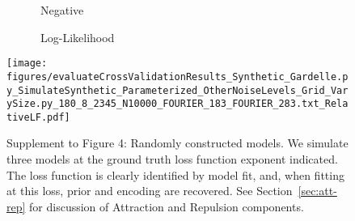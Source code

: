 \begin{figure}
\begin{minipage}[c]{0.8\linewidth}
\end{minipage}
\begin{minipage}[c]{0.19\linewidth}
\centering

\ \ \ \ \ \ Negative

\ \ \ \ \ \ Log-Likelihood


\texttt{[image: figures/evaluateCrossValidationResults\_Synthetic\_Gardelle.py\_SimulateSynthetic\_Parameterized\_OtherNoiseLevels\_Grid\_VarySize.py\_180\_8\_2345\_N10000\_FOURIER\_183\_FOURIER\_283.txt\_RelativeLF.pdf]}
\end{minipage}

\caption{Supplement to Figure 4: Randomly constructed models.
We simulate three models at the ground truth loss function exponent indicated.
The loss function is clearly identified by model fit, and, when fitting at this loss, prior and encoding are recovered.
See Section~\ref{sec:att-rep} for discussion of Attraction and Repulsion components.
}
\label{fig:fourier-8}
\end{figure}


